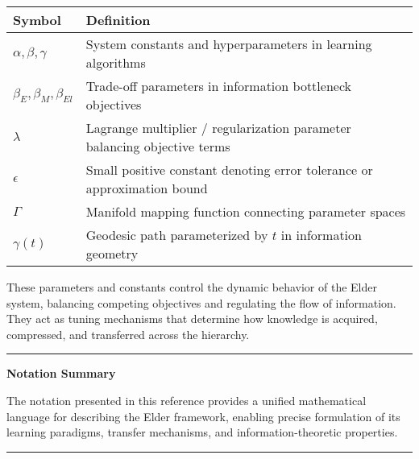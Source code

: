 \begin{center}
\begin{tabular}{>{\centering\arraybackslash}p{3cm} p{10cm}}
\hline
\textbf{Symbol} & \textbf{Definition} \\
\hline
$\alpha, \beta, \gamma$ & System constants and hyperparameters in learning algorithms \\
$\beta_E, \beta_M, \beta_{El}$ & Trade-off parameters in information bottleneck objectives \\
$\lambda$ & Lagrange multiplier / regularization parameter balancing objective terms \\
$\epsilon$ & Small positive constant denoting error tolerance or approximation bound \\
$\Gamma$ & Manifold mapping function connecting parameter spaces \\
$\gamma(t)$ & Geodesic path parameterized by $t$ in information geometry \\
\hline
\end{tabular}
\end{center}

\vspace{1cm}
\begin{center}
These parameters and constants control the dynamic behavior of the Elder system, balancing competing objectives and regulating the flow of information. They act as tuning mechanisms that determine how knowledge is acquired, compressed, and transferred across the hierarchy.
\end{center}

\clearpage
\begin{center}
\rule{0.8\textwidth}{0.5pt}

\vspace{1cm}
{\Large \textbf{Notation Summary}}
\vspace{0.5cm}

The notation presented in this reference provides a unified mathematical language for describing the Elder framework, enabling precise formulation of its learning paradigms, transfer mechanisms, and information-theoretic properties.

\vspace{0.5cm}
\rule{0.8\textwidth}{0.5pt}
\end{center}